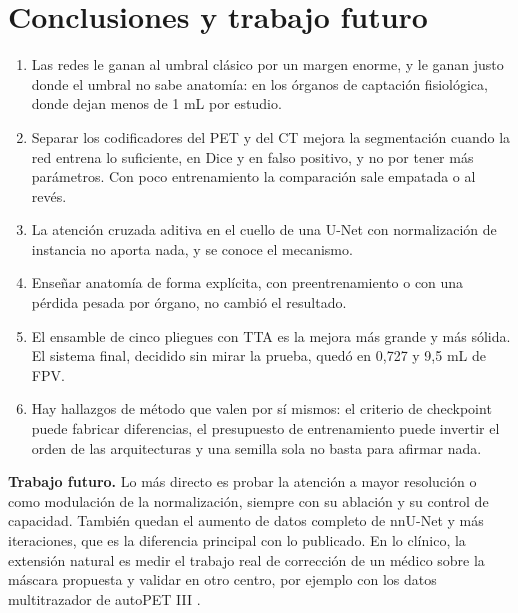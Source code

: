 \section{Conclusiones y trabajo futuro}

\begin{enumerate}
\item Las redes le ganan al umbral clásico por un margen enorme, y le ganan justo donde el umbral no sabe anatomía: en los órganos de captación fisiológica, donde dejan menos de 1 mL por estudio.
\item Separar los codificadores del PET y del CT mejora la segmentación cuando la red entrena lo suficiente, en Dice y en falso positivo, y no por tener más parámetros. Con poco entrenamiento la comparación sale empatada o al revés.
\item La atención cruzada aditiva en el cuello de una U-Net con normalización de instancia no aporta nada, y se conoce el mecanismo.
\item Enseñar anatomía de forma explícita, con preentrenamiento o con una pérdida pesada por órgano, no cambió el resultado.
\item El ensamble de cinco pliegues con TTA es la mejora más grande y más sólida. El sistema final, decidido sin mirar la prueba, quedó en \dmas{} 0,727 y 9,5 mL de FPV.
\item Hay hallazgos de método que valen por sí mismos: el criterio de checkpoint puede fabricar diferencias, el presupuesto de entrenamiento puede invertir el orden de las arquitecturas y una semilla sola no basta para afirmar nada.
\end{enumerate}

\textbf{Trabajo futuro.} Lo más directo es probar la atención a mayor resolución o como modulación de la normalización, siempre con su ablación y su control de capacidad. También quedan el aumento de datos completo de nnU-Net y más iteraciones, que es la diferencia principal con lo publicado. En lo clínico, la extensión natural es medir el trabajo real de corrección de un médico sobre la máscara propuesta y validar en otro centro, por ejemplo con los datos multitrazador de autoPET III \citep{gatidis2026autopet3}.
